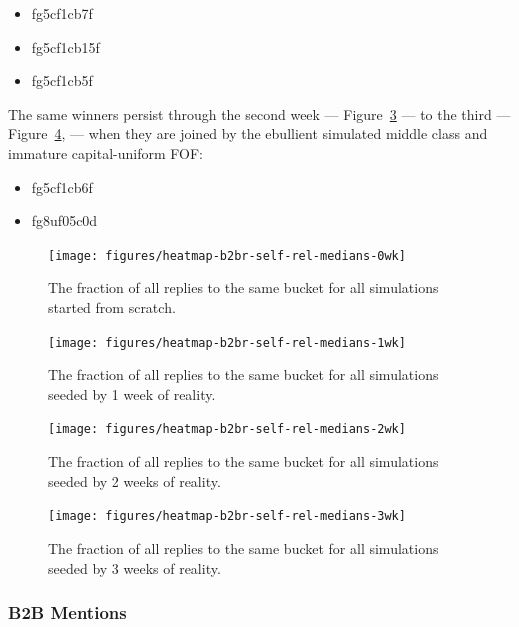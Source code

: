 \documentclass[10pt,oneside]{memoir}
\begin{document}
\begin{Spacing}{2}
\begin{itemize}


\item fg5cf1cb7f

\item fg5cf1cb15f

\item fg5cf1cb5f
\end{itemize}

The same winners persist through the second week --- Figure~\ref{figure:heatmap-b2br-self-rel-medians-2wk} ---  to the third --- Figure~\ref{figure:heatmap-b2br-self-rel-medians-3wk}, ---  when they are joined by the ebullient simulated middle class and immature capital-uniform FOF:


\begin{itemize}


\item fg5cf1cb6f

\item fg8uf05c0d
\end{itemize}


\begin{figure}
\begin{center}
    \texttt{[image: figures/heatmap-b2br-self-rel-medians-0wk]}
    \caption{The fraction of all replies to the same bucket for all simulations started from scratch.}
    \label{figure:heatmap-b2br-self-rel-medians-0wk}
\end{center}
\end{figure}

\begin{figure}
\begin{center}
    \texttt{[image: figures/heatmap-b2br-self-rel-medians-1wk]}
    \caption{The fraction of all replies to the same bucket for all simulations seeded by 1 week of reality.}
    \label{figure:heatmap-b2br-self-rel-medians-1wk}
\end{center}
\end{figure}

\begin{figure}
\begin{center}
    \texttt{[image: figures/heatmap-b2br-self-rel-medians-2wk]}
    \caption{The fraction of all replies to the same bucket for all simulations seeded by 2 weeks of reality.}
    \label{figure:heatmap-b2br-self-rel-medians-2wk}
\end{center}
\end{figure}

\begin{figure}
\begin{center}
    \texttt{[image: figures/heatmap-b2br-self-rel-medians-3wk]}
    \caption{The fraction of all replies to the same bucket for all simulations seeded by 3 weeks of reality.}
    \label{figure:heatmap-b2br-self-rel-medians-3wk}
\end{center}
\end{figure}
\pagebreak \subsubsection{B2B Mentions}
\label{b2bmentions}


\end{Spacing}
\end{document}
